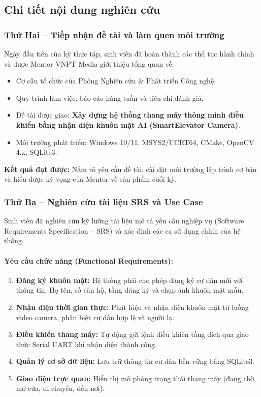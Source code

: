 \documentclass[12pt,a4paper]{article}
\begin{document}
\subsection{Chi tiết nội dung nghiên cứu}

\subsubsection{Thứ Hai -- Tiếp nhận đề tài và làm quen môi trường}

Ngày đầu tiên của kỳ thực tập, sinh viên đã hoàn thành các thủ tục hành chính và được Mentor VNPT Media giới thiệu tổng quan về:
\begin{itemize}[leftmargin=1.5cm]
    \item Cơ cấu tổ chức của Phòng Nghiên cứu \& Phát triển Công nghệ.
    \item Quy trình làm việc, báo cáo hàng tuần và tiêu chí đánh giá.
    \item Đề tài được giao: \textbf{Xây dựng hệ thống thang máy thông minh điều khiển bằng nhận diện khuôn mặt AI (SmartElevator Camera)}.
    \item Môi trường phát triển: Windows 10/11, MSYS2/UCRT64, CMake, OpenCV 4.x, SQLite3.
\end{itemize}

\textbf{Kết quả đạt được:} Nắm rõ yêu cầu đề tài, cài đặt môi trường lập trình cơ bản và hiểu được kỳ vọng của Mentor về sản phẩm cuối kỳ.

\subsubsection{Thứ Ba -- Nghiên cứu tài liệu SRS và Use Case}

Sinh viên đã nghiên cứu kỹ lưỡng tài liệu mô tả yêu cầu nghiệp vụ (Software Requirements Specification -- SRS) và xác định các ca sử dụng chính của hệ thống.

\paragraph{Yêu cầu chức năng (Functional Requirements):}
\begin{enumerate}[leftmargin=1.5cm]
    \item \textbf{Đăng ký khuôn mặt:} Hệ thống phải cho phép đăng ký cư dân mới với thông tin: Họ tên, số căn hộ, tầng đăng ký và chụp ảnh khuôn mặt mẫu.
    \item \textbf{Nhận diện thời gian thực:} Phát hiện và nhận diện khuôn mặt từ luồng video camera, phân biệt cư dân hợp lệ và người lạ.
    \item \textbf{Điều khiển thang máy:} Tự động gửi lệnh điều khiển tầng đích qua giao thức Serial UART khi nhận diện thành công.
    \item \textbf{Quản lý cơ sở dữ liệu:} Lưu trữ thông tin cư dân bền vững bằng SQLite3.
    \item \textbf{Giao diện trực quan:} Hiển thị mô phỏng trạng thái thang máy (đang chờ, mở cửa, di chuyển, đến nơi).
\end{enumerate}
\end{document}
